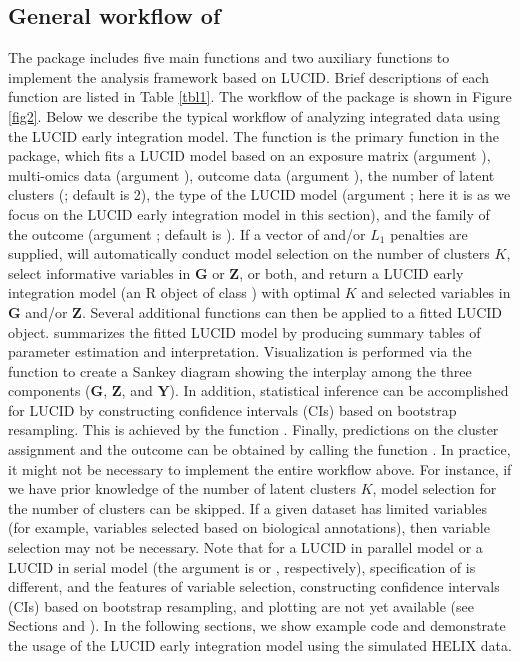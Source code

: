 \subsection{General workflow of } \label{sec2.2}
The  package includes five main functions and two auxiliary functions to implement the analysis framework based on LUCID. Brief descriptions of each function are listed in Table \ref{tbl1}. The workflow of the  package is shown in Figure \ref{fig2}. Below we describe the typical workflow of analyzing integrated data using the LUCID early integration model.
The function  is the primary function in the package, which fits a LUCID model based on an exposure matrix (argument ), multi-omics data (argument ), outcome data (argument ), the number of latent clusters (; default is 2), the type of the LUCID model (argument ; here it is  as we focus on the LUCID early integration model in this section), and the family of the outcome (argument ; default is ). If a vector of  and/or $L_1$ penalties are supplied,  will automatically conduct model selection on the number of clusters $K$, select informative variables in $\bm G$ or $\bm Z$, or both, and return a LUCID early integration model (an R object of class ) with optimal $K$ and selected variables in $\bm G$ and/or $\bm Z$. Several additional functions can then be applied to a fitted LUCID object.  summarizes the fitted LUCID model by producing summary tables of parameter estimation and interpretation. Visualization is performed via the  function to create a Sankey diagram showing the interplay among the three components ($\bm G$, $\bm Z$, and $\bm Y$). In addition, statistical inference can be accomplished for LUCID by constructing confidence intervals (CIs) based on bootstrap resampling. This is achieved by the function . Finally, predictions on the cluster assignment and the outcome can be obtained by calling the function . In practice, it might not be necessary to implement the entire workflow above. For instance, if we have prior knowledge of the number of latent clusters $K$, model selection for the number of clusters can be skipped. If a given dataset has limited variables (for example, variables selected based on biological annotations), then variable selection may not be necessary. Note that for a LUCID in parallel model or a LUCID in serial model (the argument  is  or , respectively), specification of  is different, and the features of variable selection, constructing confidence intervals (CIs) based on bootstrap resampling, and plotting are not yet available (see Sections  and ).
In the following sections, we show example code and demonstrate the usage of the LUCID early integration model using the simulated HELIX data.
